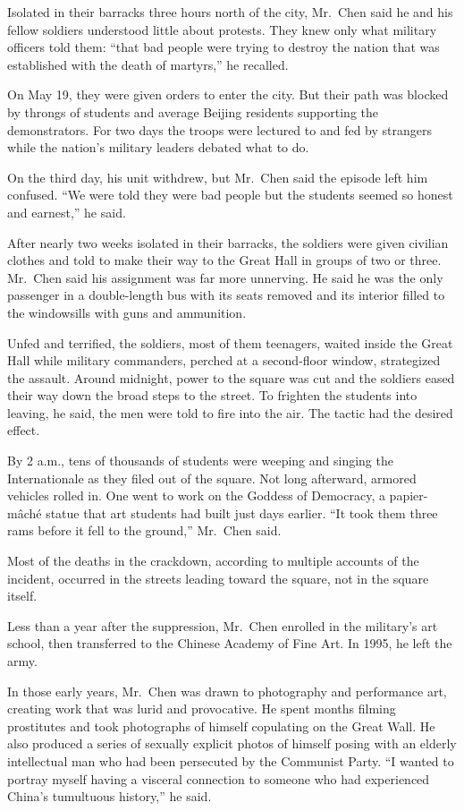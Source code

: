 \documentclass[12pt,a4paper,onecolumn]{article}
\begin{document}
Isolated in their barracks three hours north of the city, Mr.~Chen said he and his fellow soldiers
understood little about protests. They knew only what military officers told them: ``that bad people
were trying to destroy the nation that was established with the death of martyrs,'' he recalled.

On May 19, they were given orders to enter the city. But their path was blocked by throngs of
students and average Beijing residents supporting the demonstrators. For two days the troops were
lectured to and fed by strangers while the nation's military leaders debated what to do.

On the third day, his unit withdrew, but Mr.~Chen said the episode left him confused. ``We were told
they were bad people but the students seemed so honest and earnest,'' he said.

After nearly two weeks isolated in their barracks, the soldiers were given civilian clothes and told
to make their way to the Great Hall in groups of two or three. Mr.~Chen said his assignment was far
more unnerving. He said he was the only passenger in a double-length bus with its seats removed and
its interior filled to the windowsills with guns and ammunition.

Unfed and terrified, the soldiers, most of them teenagers, waited inside the Great Hall while
military commanders, perched at a second-floor window, strategized the assault. Around midnight,
power to the square was cut and the soldiers eased their way down the broad steps to the street. To
frighten the students into leaving, he said, the men were told to fire into the air. The tactic had
the desired effect.

By 2 a.m., tens of thousands of students were weeping and singing the Internationale as they filed
out of the square. Not long afterward, armored vehicles rolled in. One went to work on the Goddess
of Democracy, a papier-m\^{a}ch\'e statue that art students had built just days earlier. ``It took them
three rams before it fell to the ground,'' Mr.~Chen said.

Most of the deaths in the crackdown, according to multiple accounts of the incident, occurred in the
streets leading toward the square, not in the square itself.

Less than a year after the suppression, Mr.~Chen enrolled in the military's art school, then
transferred to the Chinese Academy of Fine Art. In 1995, he left the army.

In those early years, Mr.~Chen was drawn to photography and performance art, creating work that was
lurid and provocative. He spent months filming prostitutes and took photographs of himself
copulating on the Great Wall. He also produced a series of sexually explicit photos of himself
posing with an elderly intellectual man who had been persecuted by the Communist Party. ``I wanted
to portray myself having a visceral connection to someone who had experienced China's tumultuous
history,'' he said.
\end{document}

